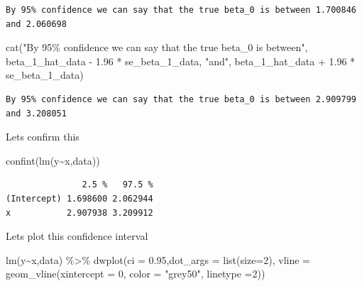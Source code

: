 \documentclass[
  letterpaper,
  DIV=11,
  numbers=noendperiod]{scrreprt}
\newenvironment{Shaded}{\begin{snugshade}}{\end{snugshade}}
\newcommand{\AttributeTok}[1]{\textcolor[rgb]{0.65,0.35,0.00}{#1}}
\newcommand{\DecValTok}[1]{\textcolor[rgb]{0.47,0.16,0.63}{#1}}
\newcommand{\FloatTok}[1]{\textcolor[rgb]{0.65,0.35,0.00}{#1}}
\newcommand{\FunctionTok}[1]{\textcolor[rgb]{0.02,0.16,0.49}{#1}}
\newcommand{\NormalTok}[1]{\textcolor[rgb]{0.33,0.33,0.33}{#1}}
\newcommand{\SpecialCharTok}[1]{\textcolor[rgb]{0.00,0.46,0.62}{#1}}
\newcommand{\StringTok}[1]{\textcolor[rgb]{0.00,0.50,0.00}{#1}}
\begin{document}
\begin{verbatim}
By 95% confidence we can say that the true beta_0 is between 1.700846 and 2.060698
\end{verbatim}

\begin{Shaded}
\begin{Highlighting}[]
\FunctionTok{cat}\NormalTok{(}\StringTok{"By 95\% confidence we can say that the true beta\_0 is between"}\NormalTok{, beta\_1\_hat\_data }\SpecialCharTok{{-}} \FloatTok{1.96} \SpecialCharTok{*}\NormalTok{ se\_beta\_1\_data, }\StringTok{"and"}\NormalTok{, beta\_1\_hat\_data }\SpecialCharTok{+} \FloatTok{1.96} \SpecialCharTok{*}\NormalTok{ se\_beta\_1\_data)}
\end{Highlighting}
\end{Shaded}

\begin{verbatim}
By 95% confidence we can say that the true beta_0 is between 2.909799 and 3.208051
\end{verbatim}

Lets confirm this

\begin{Shaded}
\begin{Highlighting}[]
\FunctionTok{confint}\NormalTok{(}\FunctionTok{lm}\NormalTok{(y}\SpecialCharTok{\textasciitilde{}}\NormalTok{x,data))}
\end{Highlighting}
\end{Shaded}

\begin{verbatim}
               2.5 %   97.5 %
(Intercept) 1.698600 2.062944
x           2.907938 3.209912
\end{verbatim}

Lets plot this confidence interval

\begin{Shaded}
\begin{Highlighting}[]
\FunctionTok{lm}\NormalTok{(y}\SpecialCharTok{\textasciitilde{}}\NormalTok{x,data) }\SpecialCharTok{\%\textgreater{}\%} 
  \FunctionTok{dwplot}\NormalTok{(}\AttributeTok{ci =} \FloatTok{0.95}\NormalTok{,}\AttributeTok{dot\_args =} \FunctionTok{list}\NormalTok{(}\AttributeTok{size=}\DecValTok{2}\NormalTok{), }\AttributeTok{vline =} \FunctionTok{geom\_vline}\NormalTok{(}\AttributeTok{xintercept =} \DecValTok{0}\NormalTok{, }\AttributeTok{color =} \StringTok{"grey50"}\NormalTok{, }\AttributeTok{linetype =}\DecValTok{2}\NormalTok{))}
\end{Highlighting}
\end{Shaded}
\end{document}
